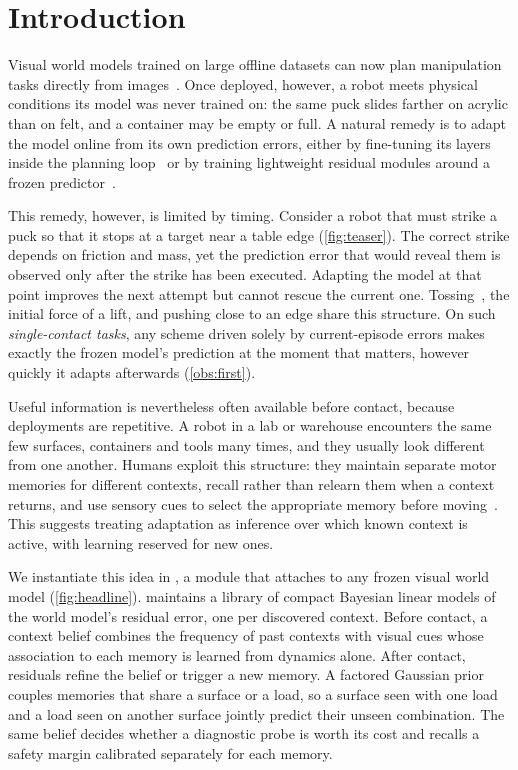 \section{Introduction}\label{sec:intro}



Visual world models trained on large offline datasets can now plan manipulation tasks directly from images~\citep{zhou2025dinowm,assran2025vjepa2,sobal2025pldm}. Once deployed, however, a robot meets physical conditions its model was never trained on: the same puck slides farther on acrylic than on felt, and a container may be empty or full. A natural remedy is to adapt the model online from its own prediction errors, either by fine-tuning its layers inside the planning loop~\citep{wang2026adajepa} or by training lightweight residual modules around a frozen predictor~\citep{soni2026sandwich}.

This remedy, however, is limited by timing. Consider a robot that must strike a puck so that it stops at a target near a table edge (\cref{fig:teaser}). The correct strike depends on friction and mass, yet the prediction error that would reveal them is observed only after the strike has been executed. Adapting the model at that point improves the next attempt but cannot rescue the current one. Tossing~\citep{zeng2020tossingbot}, the initial force of a lift, and pushing close to an edge share this structure. On such \emph{single-contact tasks}, any scheme driven solely by current-episode errors makes exactly the frozen model's prediction at the moment that matters, however quickly it adapts afterwards (\cref{obs:first}).

Useful information is nevertheless often available before contact, because deployments are repetitive. A robot in a lab or warehouse encounters the same few surfaces, containers and tools many times, and they usually look different from one another. Humans exploit this structure: they maintain separate motor memories for different contexts, recall rather than relearn them when a context returns, and use sensory cues to select the appropriate memory before moving~\citep{heald2021coin,haruno2001mosaic}. This suggests treating adaptation as inference over which known context is active, with learning reserved for new ones.

We instantiate this idea in \method, a module that attaches to any frozen visual world model (\cref{fig:headline}). \method maintains a library of compact Bayesian linear models of the world model's residual error, one per discovered context. Before contact, a context belief combines the frequency of past contexts with visual cues whose association to each memory is learned from dynamics alone. After contact, residuals refine the belief or trigger a new memory. A factored Gaussian prior couples memories that share a surface or a load, so a surface seen with one load and a load seen on another surface jointly predict their unseen combination. The same belief decides whether a diagnostic probe is worth its cost and recalls a safety margin calibrated separately for each memory.

